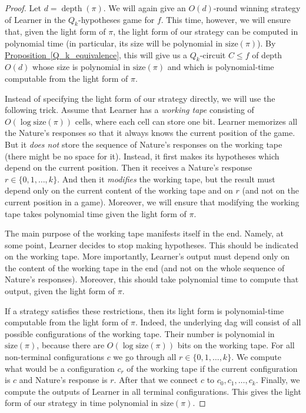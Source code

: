 \documentclass[11pt]{article}
\numberwithin{equation}{section}
\theoremstyle{definition}
\theoremstyle{plain}
\newcommand{\expref}[2]{\hyperref[#2]{#1~\ref{#2}}}
\DeclareMathOperator{\depth}{depth}  %
\begin{document}
\begin{proof}
Let $d = \depth(\pi)$.
We will again give an $O(d)$-round winning strategy of Learner in the $Q_k$-hypotheses game for $f$. This time, however, we will ensure that, given the light form of $\pi$, the light form of our strategy can be computed in polynomial time (in particular, its size will be polynomial in $\mathrm{size}(\pi)$). By \expref{Proposition}{Q_k_equivalence}, this will give us
%
a $Q_k$-circuit $C\le f$
of depth $O(d)$  %
whose size is polynomial in $\mathrm{size}(\pi)$ and which is polynomial-time computable from the light form of $\pi$.

Instead of specifying the light form of our strategy directly, we will use the following trick. Assume that Learner has a \emph{working tape} consisting of $O(\log \mathrm{size}(\pi))$ cells, where each cell can store one bit. Learner memorizes all the Nature's responses so that it %
 always knows the current position of the game. 
 But it %
 \emph{does not} store the sequence of Nature's responses on the working tape (there might be no space for it). 
Instead, it %
 first makes its %
hypotheses which depend on the current position. 
Then it %
 receives a Nature's response $r\in \{0, 1, \ldots, k\}$. 
And then it %
 \emph{modifies} the working tape, but the result must depend only on the current content of the working tape and on $r$ (and not on the current position in a game). 
Moreover, we will ensure that modifying the working tape takes  polynomial time given the light form of $\pi$.  

The main purpose of the working tape manifests itself in the end. Namely, at some point, Learner decides to stop making hypotheses. This should be indicated on the working tape. More importantly, Learner's output must depend only on the content of the working tape in the end (and not on the whole sequence of Nature's responses). Moreover, this should take polynomial time to compute that output, given the light form of $\pi$. 

If a strategy satisfies these restrictions, then its light form is polynomial-time computable from the light form of $\pi$. Indeed, the underlying dag will consist of all possible configurations of the working tape. Their number is polynomial in $\mathrm{size}(\pi)$, because there are $O(\log \mathrm{size}(\pi))$ bits on the working tape. For all non-terminal configurations $c$ we go through all $r\in\{0, 1, \ldots, k\}$. We compute what would be a configuration $c_r$ of the working tape if the current configuration is $c$ and Nature's response is $r$. After that we connect $c$ to $c_0, c_1, \ldots, c_k$. Finally, we compute the outputs of Learner in all terminal configurations. This gives the light form of our strategy in time polynomial in $\mathrm{size}(\pi)$.


\end{proof}
\end{document}
